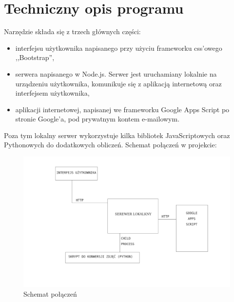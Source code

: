 \chapter{Techniczny opis programu} 
Narzędzie składa się z trzech głównych części:
\begin{itemize}
\item interfejsu użytkownika napisanego przy użyciu frameworku css'owego ,,Bootstrap'',
\item serwera napisanego w Node.js. Serwer jest uruchamiany lokalnie na urządzeniu użytkownika, komunikuje się z aplikacją internetową oraz interfejsem użytkownika,
\item aplikacji internetowej, napisanej we frameworku Google Apps Script po stronie Google'a, pod prywatnym kontem e-mailowym.


\end{itemize}
Poza tym lokalny serwer wykorzystuje kilka bibliotek JavaScriptowych oraz Pythonowych do dodatkowych obliczeń. Schemat połączeń w projekcie:
\begin{figure}[H]
  \includegraphics{schemat.png}
  \caption{Schemat połączeń}
  \label{fig:1}
\end{figure}
